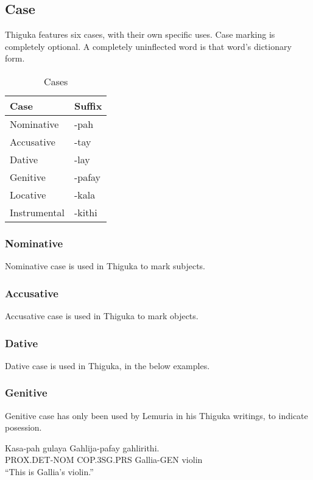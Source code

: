 \newpage{}

\subsection{Case}
Thiguka features six cases, with their own specific uses.
Case marking is completely optional.
A completely uninflected word is that word's dictionary form.

\begin{table}[h!]
    \centering
    \caption{Cases}
    \begin{tabularx}{8cm}{|X|X|}
        \hline
        \textbf{Case} & \textbf{Suffix} \\
        \hline
        Nominative & -pah \\
        Accusative & -tay \\
        Dative & -lay \\
        Genitive & -pafay \\
        Locative & -kala \\
        Instrumental & -kithi \\ 
        \hline
    \end{tabularx}
\end{table}

\subsubsection{Nominative}
Nominative case is used in Thiguka to mark subjects.

\subsubsection{Accusative}
Accusative case is used in Thiguka to mark objects.

\subsubsection{Dative}
Dative case is used in Thiguka, in the below examples.

\subsubsection{Genitive}
Genitive case has only been used by Lemuria in his Thiguka writings, to indicate posession.

\begin{exe}
\ex{} \gll{}Kasa-pah     gulaya     Gahlija-pafay gahlirithi.\\
            PROX.DET-NOM COP.3SG.PRS Gallia-GEN   violin\\
    \glt{}``This is Gallia's violin.''
\end{exe}

